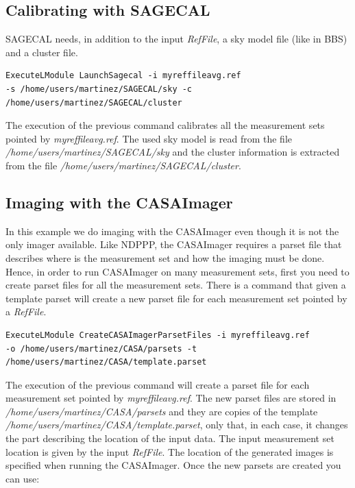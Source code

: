 \documentclass[a4paper,11pt]{article}
\begin{document}
\subsection{Calibrating with SAGECAL}

SAGECAL needs, in addition to the input \textit{RefFile}, a sky model file (like in BBS) and a cluster file.

\begin{verbatim}
ExecuteLModule LaunchSagecal -i myreffileavg.ref
-s /home/users/martinez/SAGECAL/sky -c /home/users/martinez/SAGECAL/cluster
\end{verbatim}

The execution of the previous command calibrates all the measurement sets pointed by \textit{myreffileavg.ref}. The used sky model is read from the file \textit{/home/users/martinez/SAGECAL/sky} and the cluster information is extracted from the file \textit{/home/users/martinez/SAGECAL/cluster}.

\subsection{Imaging with the CASAImager}

In this example we do imaging with the CASAImager even though it is not the only imager available.
Like NDPPP, the CASAImager requires a parset file that describes where is the measurement set and how the imaging must be done. Hence, in order to run CASAImager on many measurement sets, first you need to create parset files for all the measurement sets. There is a command that given a template parset will create a new parset file for each measurement set pointed by a \textit{RefFile}.

\begin{verbatim}
ExecuteLModule CreateCASAImagerParsetFiles -i myreffileavg.ref 
-o /home/users/martinez/CASA/parsets -t /home/users/martinez/CASA/template.parset
\end{verbatim}

The execution of the previous command will create a parset file for each measurement set pointed by \textit{myreffileavg.ref}. The new parset files are stored in \textit{/home/users/martinez/CASA/parsets} and they are copies of the template \textit{/home/users/martinez/CASA/template.parset}, only that, in each case, it changes the part describing the location of the input data. The input measurement set location is given by the input \textit{RefFile}. The location of the generated images is specified when running the CASAImager. Once the new parsets are created you can use:
\end{document}
